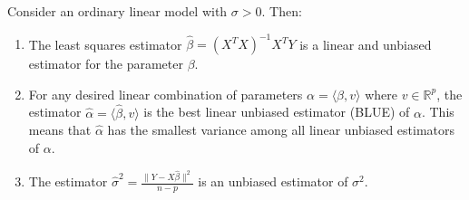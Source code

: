 \documentclass[open=any, 11pt,paper=A4]{scrreprt}
\begin{document}
\begin{theorem}
    Consider an ordinary linear model with \( \sigma > 0 \). Then:
    \begin{enumerate}
        \item The least squares estimator \( \hat{\beta} = (X^T X)^{-1} X^T Y \) is a linear and unbiased estimator for the parameter \( \beta \).
        \item For any desired linear combination of parameters \( \alpha = \langle \beta, v \rangle \) where \( v \in \mathbb{R}^p \), the estimator \( \hat{\alpha} = \langle \hat{\beta}, v \rangle \) is the best linear unbiased estimator (BLUE) of \( \alpha \). This means that \( \hat{\alpha} \) has the smallest variance among all linear unbiased estimators of \( \alpha \).
        \item The estimator \( \hat{\sigma}^2 = \frac{\| Y - X \hat{\beta} \|^2}{n - p} \) is an unbiased estimator of \( \sigma^2 \).
    \end{enumerate}
\end{theorem}
\end{document}
